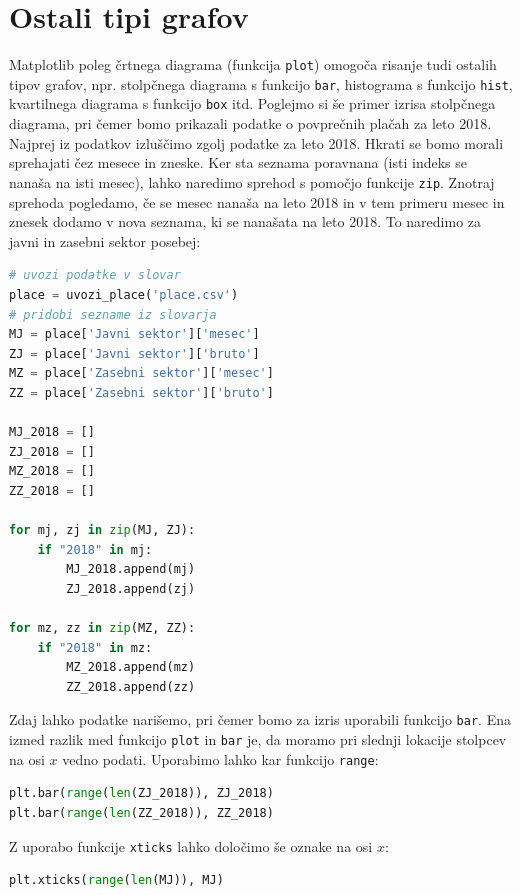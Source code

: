 \section{Ostali tipi grafov}

Matplotlib poleg črtnega diagrama (funkcija \texttt{plot}) omogoča risanje tudi ostalih tipov grafov, npr. stolpčnega diagrama  s funkcijo \texttt{bar}, histograma s funkcijo \texttt{hist}, kvartilnega diagrama s funkcijo \texttt{box} itd. Poglejmo si še primer izrisa stolpčnega diagrama, pri čemer bomo prikazali podatke o povprečnih plačah za leto 2018. Najprej iz podatkov izluščimo zgolj podatke za leto 2018. Hkrati se bomo morali sprehajati čez mesece in zneske. Ker sta seznama poravnana (isti indeks se nanaša na isti mesec), lahko naredimo sprehod s pomočjo funkcije \texttt{zip}. Znotraj sprehoda pogledamo, če se mesec nanaša na leto 2018 in v tem primeru mesec in znesek dodamo v nova seznama, ki se nanašata na leto 2018. To naredimo za javni in zasebni sektor posebej:
\begin{lstlisting}[language=Python, showstringspaces=false]
# uvozi podatke v slovar
place = uvozi_place('place.csv')
# pridobi sezname iz slovarja
MJ = place['Javni sektor']['mesec']
ZJ = place['Javni sektor']['bruto']
MZ = place['Zasebni sektor']['mesec']
ZZ = place['Zasebni sektor']['bruto']

MJ_2018 = []
ZJ_2018 = []
MZ_2018 = []
ZZ_2018 = []

for mj, zj in zip(MJ, ZJ):
    if "2018" in mj:
        MJ_2018.append(mj)
        ZJ_2018.append(zj)

for mz, zz in zip(MZ, ZZ):
    if "2018" in mz:
        MZ_2018.append(mz)
        ZZ_2018.append(zz)
\end{lstlisting}

Zdaj lahko podatke narišemo, pri čemer bomo za izris uporabili funkcijo \texttt{bar}. Ena izmed razlik med funkcijo \texttt{plot} in \texttt{bar} je, da moramo pri slednji lokacije stolpcev na osi $x$ vedno podati. Uporabimo lahko kar funkcijo \texttt{range}:
\begin{lstlisting}[language=Python, showstringspaces=false]
plt.bar(range(len(ZJ_2018)), ZJ_2018)
plt.bar(range(len(ZZ_2018)), ZZ_2018)
\end{lstlisting}

Z uporabo funkcije \texttt{xticks} lahko določimo še oznake na osi $x$:
\begin{lstlisting}[language=Python]
plt.xticks(range(len(MJ)), MJ)
\end{lstlisting}

